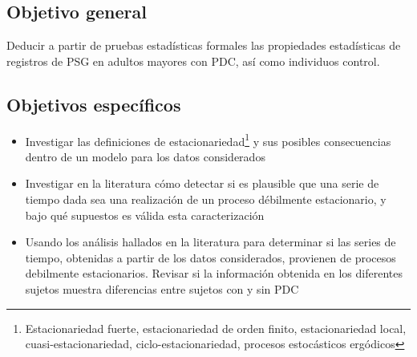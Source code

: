\subsection{Objetivo general}

Deducir a partir de pruebas estad\'isticas formales las propiedades
estad\'isticas de registros de PSG en adultos mayores con PDC, as\'i como individuos control.


\subsection{Objetivos espec\'ificos}

\begin{itemize}
\item Investigar las definiciones de estacionariedad\footnote{Estacionariedad fuerte, 
estacionariedad de orden finito, estacionariedad local, cuasi-estacionariedad,
ciclo-estacionariedad, procesos estoc\'asticos erg\'odicos} y sus posibles consecuencias dentro
de un modelo para los datos considerados

\item Investigar en la literatura c\'omo detectar si es plausible que una serie de tiempo 
dada sea una realizaci\'on de un proceso d\'ebilmente estacionario, 
y bajo qu\'e supuestos es v\'alida esta caracterizaci\'on

\item Usando los an\'alisis hallados en la literatura para determinar si las series de tiempo,
obtenidas a partir de los datos considerados, provienen de procesos
debilmente estacionarios.
Revisar si la informaci\'on obtenida en los diferentes sujetos muestra diferencias entre
sujetos con y sin PDC


\end{itemize}

